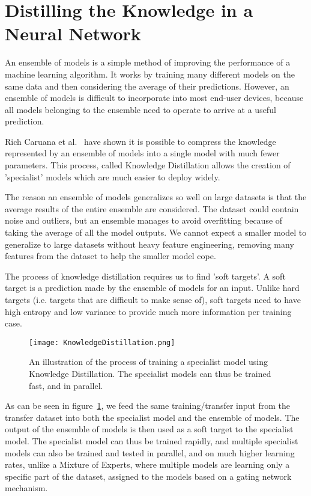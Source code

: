 \section{Distilling the Knowledge in a Neural Network}

An ensemble of models is a simple method of improving the performance of a machine learning algorithm.
It works by training many different models on the same data and then considering the average of their predictions.
However, an ensemble of models is difficult to incorporate into most end-user devices, because all models belonging to the ensemble need to operate to arrive at a useful prediction.

Rich Caruana et al.~\cite{caruana2015compression} have shown it is possible to compress the knowledge
represented by an ensemble of models into a single model with much fewer parameters. This process, called
Knowledge Distillation allows the creation of 'specialist' models which are much easier to deploy widely.

The reason an ensemble of models generalizes so well on large datasets is that the average results of the entire ensemble are considered. The dataset could contain noise and outliers, but an ensemble manages to avoid overfitting because of taking the average of all the model outputs. We cannot expect a smaller model to generalize to large 
datasets without heavy feature engineering, removing many features from the dataset to help the smaller model cope.

The process of knowledge distillation requires us to find 'soft targets'. A soft target is a prediction made by the ensemble of models for an input. Unlike hard targets (i.e. targets that are difficult to make sense of), 
soft targets need to have high entropy and low variance to provide much more information per training case.

\begin{figure}[h]
    \begin{center}
        \texttt{[image: KnowledgeDistillation.png]}
    \end{center}
    \caption{An illustration of the process of training a specialist model using Knowledge Distillation.
    The specialist models can thus be trained fast, and in parallel.}
    \label{fig:distillation}
\end{figure}

As can be seen in figure~\ref{fig:distillation}, we feed the same training/transfer input 
from the transfer dataset into both the specialist model and the ensemble of models. 
The output of the ensemble of models is then used as a soft target to the specialist model.
The specialist model can thus be trained rapidly, and multiple specialist models can also 
be trained and tested in parallel, and on much higher learning rates, unlike a Mixture of Experts, 
where multiple models are learning only a specific part of the dataset, assigned to the models 
based on a gating network mechanism.


